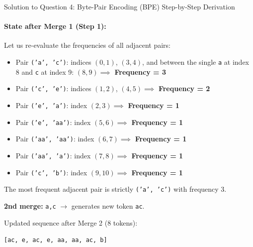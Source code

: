 \documentclass[11pt,a4paper]{article}
\begin{document}
\begin{solutionbox}{Solution to Question 4: Byte-Pair Encoding (BPE) Step-by-Step Derivation}
\paragraph{State after Merge 1 (Step 1):}
Let us re-evaluate the frequencies of all adjacent pairs:
\begin{itemize}[leftmargin=2em]
    \item Pair \texttt{('a', 'c')}: indices $(0,1)$, $(3,4)$, and between the single \texttt{a} at index 8 and \texttt{c} at index 9: $(8,9) \implies$ \textbf{Frequency = 3}
    \item Pair \texttt{('c', 'e')}: indices $(1,2)$, $(4,5) \implies$ \textbf{Frequency = 2}
    \item Pair \texttt{('e', 'a')}: index $(2,3) \implies$ \textbf{Frequency = 1}
    \item Pair \texttt{('e', 'aa')}: index $(5,6) \implies$ \textbf{Frequency = 1}
    \item Pair \texttt{('aa', 'aa')}: index $(6,7) \implies$ \textbf{Frequency = 1}
    \item Pair \texttt{('aa', 'a')}: index $(7,8) \implies$ \textbf{Frequency = 1}
    \item Pair \texttt{('c', 'b')}: index $(9,10) \implies$ \textbf{Frequency = 1}
\end{itemize}
The most frequent adjacent pair is strictly \texttt{('a', 'c')} with frequency 3.
\begin{takeawaybox}
\textbf{2nd merge:} \texttt{a,c} $\longrightarrow$ generates new token \texttt{ac}.
\end{takeawaybox}
Updated sequence after Merge 2 (8 tokens):
\begin{center}
\texttt{[ac, e, ac, e, aa, aa, ac, b]}
\end{center}


\end{solutionbox}
\end{document}
